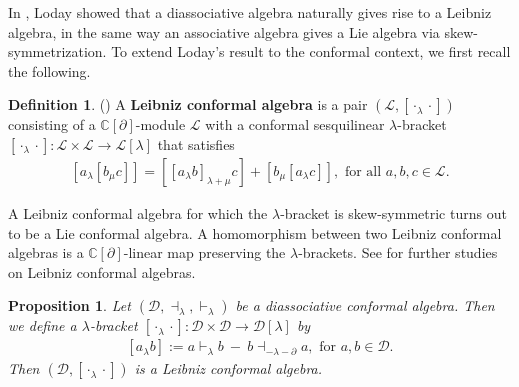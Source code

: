 \documentclass[a4paper,reqno,10pt]{amsart}
\theoremstyle{plain}
\newtheorem{proposition}[thm]{Proposition}
\theoremstyle{definition}
\newtheorem{definition}[thm]{Definition}
\theoremstyle{remark}
\newcommand{\C}{\mathbb{C}}
\newcommand{\D}{\mathcal{D}}
\newcommand{\p}{\partial}
\newcommand{\la}{\lambda}
\begin{document}
In \cite{loday1}, Loday showed that a diassociative algebra naturally gives rise to a Leibniz algebra, in the same way an associative algebra gives a Lie algebra via skew-symmetrization. To extend Loday's result to the conformal context, we first recall the following.

\begin{definition}
    (\cite{bakalov-kac-voronov,zhang}) A {\bf Leibniz conformal algebra} is a pair $(\mathcal{L},[\cdot_{\la}\cdot])$ consisting of a $\C[\p]$-module $\mathcal{L}$ with a conformal sesquilinear $\la$-bracket $[\cdot_{\la}\cdot]:\mathcal{L} \times \mathcal{L} \to \mathcal{L}[   \la ] $ that satisfies
\begin{align}\label{conf-leib}
 [a_{\la}[b_{\mu}c]] =[[a_{\la}b]_{\la+\mu}c]
+ [b_{\mu}[a_{\la}c]], \text{ for all } a,b,c \in \mathcal{L}. 
\end{align}
\end{definition}

A Leibniz conformal algebra for which the $\la$-bracket is skew-symmetric turns out to be a Lie conformal algebra. A homomorphism between two Leibniz conformal algebras is a $\C [\p]$-linear map preserving the $\la$-brackets. See \cite{das-sahoo, zhang,zhou} for further studies on Leibniz conformal algebras.

\begin{proposition}\label{prop-di-leib}
    Let $(\D,\dashv_{\la},\vdash_{\la})$ be a diassociative conformal algebra. Then we define a $\la$-bracket $[ \cdot_\la \cdot ] : \D \times \D \rightarrow \D [\la]$ by
\begin{align}\label{lambda-bracket}
    [a_{\la}b] := a\vdash_{\la}b ~ \! - ~ \! b\dashv_{-\la-\partial}a, \text{ for } a,b\in\D.
\end{align}
Then $(\D, [ \cdot_\la \cdot ])$ is a Leibniz conformal algebra. 
\end{proposition}
\end{document}
